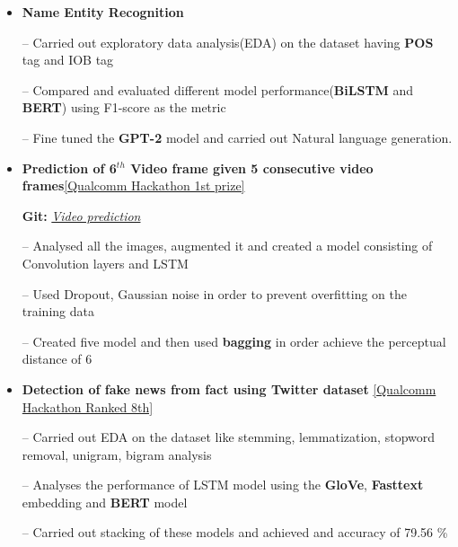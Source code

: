 \documentclass{article}
\begin{document}
\begin{itemize}
\setlength{\itemsep}{-0.15em}

\item \textbf{Name Entity Recognition}
\item[--] Carried out exploratory data analysis(EDA) on the dataset having \textbf{POS} tag and IOB tag
\item[--] Compared and evaluated different model performance(\textbf{BiLSTM} and \textbf{BERT}) using F1-score as the metric
\item[--] Fine tuned the \textbf{GPT-2} model and carried out Natural language generation.

\item \textbf{Prediction of {6$^{th}$} Video frame given 5 consecutive video frames}\hfill{\href{https://drive.google.com/file/d/1uwSr-1dlImn5JYRzPpn62ublzCWKSGr0/view?usp=sharing}{[Qualcomm Hackathon 1st prize]}}

\textbf{Git:} \href{https://github.com/153079019shariq/catz_contest}{\textit{Video prediction}}
\item[--] Analysed all the images, augmented it  and created a model consisting of Convolution layers and LSTM
\item[--] Used Dropout, Gaussian noise in order to prevent overfitting on the training data
\item[--]Created five model and then used \textbf{bagging} in order achieve the perceptual distance of 6 

\item \textbf{Detection of fake news from fact using Twitter dataset}
\hfill{\href{https://drive.google.com/file/d/1mOlilPLZSuHSyqRIVukRvXs_700Hmz5I/view?usp=sharing}{[Qualcomm Hackathon Ranked 8th]}}
\item[--] Carried out EDA on the dataset like stemming, lemmatization, stopword removal, unigram, bigram analysis
\item[--] Analyses the performance of LSTM model using the \textbf{GloVe}, \textbf{Fasttext} embedding and \textbf{BERT}  model
\item[--] Carried out stacking of these models and achieved and accuracy of 79.56 \%
\end{itemize}
\end{document}
